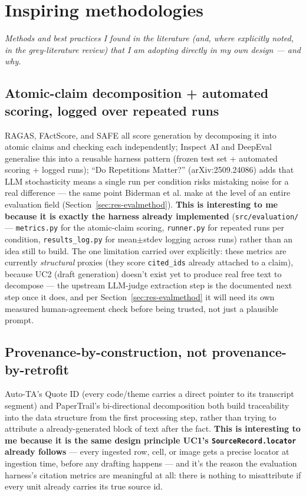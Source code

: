 \section{Inspiring methodologies}\label{sec:methods}

\textit{Methods and best practices I found in the literature (and, where explicitly noted, in the grey-literature review) that I am adopting directly in my own design — and why.}



\subsection{Atomic-claim decomposition + automated scoring, logged over repeated runs}\label{sec:m-harness}

RAGAS, FActScore, and SAFE all score generation by decomposing it into atomic claims and checking each independently; Inspect AI and DeepEval generalise this into a reusable harness pattern (frozen test set + automated scoring + logged runs); \textquotedblleft{}Do Repetitions Matter?\textquotedblright{} (arXiv:2509.24086) adds that LLM stochasticity means a single run per condition risks mistaking noise for a real difference — the same point Biderman et al. make at the level of an entire evaluation field (Section~\ref{sec:res-evalmethod}). \textbf{This is interesting to me because it is exactly the harness already implemented} (\texttt{src/evaluation/} — \texttt{metrics.py} for the atomic-claim scoring, \texttt{runner.py} for repeated runs per condition, \texttt{results\_log.py} for mean$\pm$stdev logging across runs) rather than an idea still to build. The one limitation carried over explicitly: these metrics are currently \textit{structural} proxies (they score \texttt{cited\_ids} already attached to a claim), because UC2 (draft generation) doesn't exist yet to produce real free text to decompose — the upstream LLM-judge extraction step is the documented next step once it does, and per Section~\ref{sec:res-evalmethod} it will need its own measured human-agreement check before being trusted, not just a plausible prompt.



\subsection{Provenance-by-construction, not provenance-by-retrofit}\label{sec:m-provenance}

Auto-TA's Quote ID (every code/theme carries a direct pointer to its transcript segment) and PaperTrail's bi-directional decomposition both build traceability into the data structure from the first processing step, rather than trying to attribute a already-generated block of text after the fact. \textbf{This is interesting to me because it is the same design principle UC1's \texttt{SourceRecord.locator} already follows} — every ingested row, cell, or image gets a precise locator at ingestion time, before any drafting happens — and it's the reason the evaluation harness's citation metrics are meaningful at all: there is nothing to misattribute if every unit already carries its true source id.




